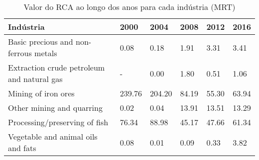 \begin{table}
\centering
\caption{Valor do RCA ao longo dos anos para cada indústria (MRT)}
\label{tab:ex3-tempo-MRT}
\begin{tabular}{p{6cm}p{1.5cm}p{1.5cm}p{1.5cm}p{1.5cm}p{1.5cm}}
\toprule
                                 Indústria &   2000 &   2004 &  2008 &  2012 &  2016 \\
\midrule
     Basic precious and non-ferrous metals &   0.08 &   0.18 &  1.91 &  3.31 &  3.41 \\
Extraction crude petroleum and natural gas &      - &   0.00 &  1.80 &  0.51 &  1.06 \\
                       Mining of iron ores & 239.76 & 204.20 & 84.19 & 55.30 & 63.94 \\
                 Other mining and quarring &   0.02 &   0.04 & 13.91 & 13.51 & 13.29 \\
             Processing/preserving of fish &  76.34 &  88.98 & 45.17 & 47.66 & 61.34 \\
        Vegetable and animal oils and fats &   0.08 &   0.01 &  0.09 &  0.33 &  3.82 \\
\bottomrule
\end{tabular}
\end{table}
